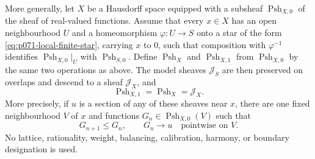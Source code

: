 \begin{theorem}
More generally, let $X$ be a Hausdorff space equipped with a subsheaf
$\operatorname{Psh}_{X,0}$ of the sheaf of real-valued functions.  Assume
that every $x\in X$ has an open neighbourhood $U$ and a homeomorphism
$\varphi:U\to S$ onto a star of the form
\eqref{eq:p071-local-finite-star}, carrying $x$ to $0$, such that
composition with $\varphi^{-1}$ identifies
$\operatorname{Psh}_{X,0}|_U$ with $\operatorname{Psh}_{S,0}$.  Define
$\operatorname{Psh}_X$ and $\operatorname{Psh}_{X,1}$ from
$\operatorname{Psh}_{X,0}$ by the same two operations as above.  The model
sheaves $\mathscr J_S$ are then preserved on overlaps and descend to a
sheaf $\mathscr J_X$, and
\begin{equation}
\label{eq:ch16-collapse-finite-tropical-curves}
 \operatorname{Psh}_{X,1}=\operatorname{Psh}_X=\mathscr J_X.
\end{equation}
More precisely, if $u$ is a section of any of these sheaves near $x$, there
are one fixed neighbourhood $V$ of $x$ and functions
$G_n\in\operatorname{Psh}_{X,0}(V)$ such that
\begin{equation}
\label{eq:p071-fixed-neighbourhood-approximation}
 G_{n+1}\leq G_n,
 \qquad
 G_n\longrightarrow u
 \quad\text{pointwise on }V.
\end{equation}
No lattice, rationality, weight, balancing, calibration, harmony, or
boundary designation is used.
\end{theorem}
